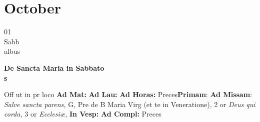 \documentclass[10pt, openany]{book}
\begin{document}
        \chapter{October}
                        
        \begin{center}
            \begin{minipage}{3.5in}
                \vspace{2em}
                \begin{minipage}{0.5in}
                    {\Huge 01} \\
                    {\normalsize Sabb} \\
                    {\normalsize albus}
                \end{minipage}
                \begin{minipage}{3.0in}
                    \textbf{ \large De Sancta Maria in Sabbato \\
                    \textnormal{\normalsize s}} \\ 
                \end{minipage}
                \begin{justify}Off ut in pr loco
                    \textbf{Ad Mat: }
                    \textbf{Ad Lau: }
                    \textbf{Ad Horas: }Preces\textbf{Primam}: \textbf{Ad Missam}: \textit{Salve sancta parens,} G, Pre de B Maria Virg (et te in Veneratione), 2 or \textit{Deus qui corda,} 3 or \textit{Ecclesiæ,}  
                    \textbf{In Vesp: }
                    \textbf{Ad Compl: }Preces
                \end{justify}
            \end{minipage}
        \end{center}
    
\end{document}
